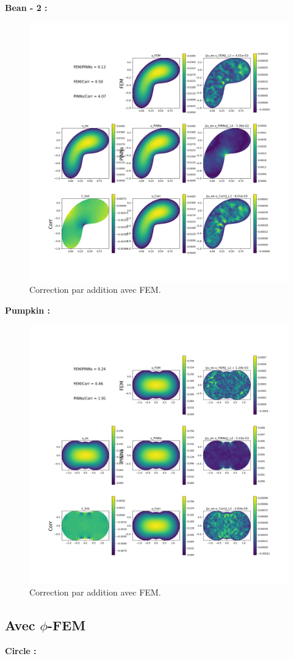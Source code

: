 \documentclass[french]{article}
\begin{document}
	\textbf{Bean - 2 :}
	
	\begin{figure}[H]
		\centering
		\includegraphics[width=0.55\linewidth]{"correction/bean/corr_FEM_2.png"}
		\caption{Correction par addition avec FEM.}
	\end{figure}

	\textbf{Pumpkin :}
	
	\begin{figure}[H]
		\centering
		\includegraphics[width=0.55\linewidth]{"correction/pumpkin/corr_FEM.png"}
		\caption{Correction par addition avec FEM.}
	\end{figure}
	
	
	\newpage
	\subsection{Avec $\phi$-FEM}
	
	\textbf{Circle :}
	
\end{document}
